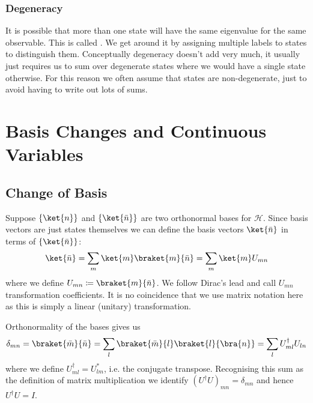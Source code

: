 \documentclass[fleqn]{NotesClass}
\newcommand*{\hilbert}{\mathcal{H}}
\newcommand*{\hermit}{\dagger}
\newcommand{\ident}{I}
\begin{document}
    \subsection{Degeneracy}
    It is possible that more than one state will have the same eigenvalue for the same observable.
    This is called .
    We get around it by assigning multiple labels to states to distinguish them.
    Conceptually degeneracy doesn't add very much, it usually just requires us to sum over degenerate states where we would have a single state otherwise.
    For this reason we often assume that states are non-degenerate, just to avoid having to write out lots of sums.
    
    \chapter{Basis Changes and Continuous Variables}
    \section{Change of Basis}
    Suppose \(\{\ket{n}\}\) and \(\{\ket{\bar{n}}\}\) are two orthonormal bases for \(\hilbert\).
    Since basis vectors are just states themselves we can define the basis vectors \(\ket{\bar{n}}\) in terms of \(\{\ket{\bar{n}}\}\):
    \begin{equation}
        \ket{\bar{n}} = \sum_m \ket{m}\braket{m}{\bar{n}} = \sum_m\ket{m}U_{mn}
    \end{equation}
    where we define \(U_{mn} \coloneqq \braket{m}{\bar{n}}\).
    We follow Dirac's lead and call \(U_{mn}\) transformation coefficients.
    It is no coincidence that we use matrix notation here as this is simply a linear (unitary) transformation.
    
    Orthonormality of the bases gives us
    \begin{equation}
        \delta_{mn} = \braket{\bar{m}}{\bar{n}} = \sum_l \braket{\bar{m}}{l}\braket{l}{\bra{n}} = \sum_l U_{ml}^\hermit U_{ln}
    \end{equation}
    where we define \(U_{ml}^\hermit = U_{lm}^*\), i.e. the conjugate transpose.
    Recognising this sum as the definition of matrix multiplication we identify \((U^\hermit U)_{mn} = \delta_{mn}\) and hence \(U^\hermit U = \ident\).
    
\end{document}

